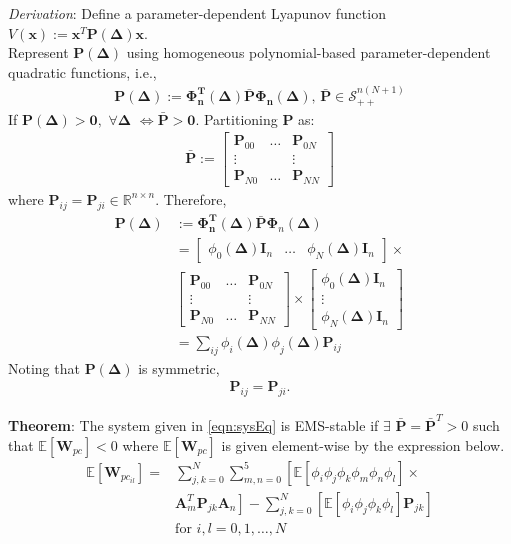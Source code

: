 \documentclass[letterpaper, 10 pt, conference]{ieeeconf}  %
\newcommand{\real}{\mathbb{R}}
\newcommand{\vo}[1]{\boldsymbol{#1}}
\newcommand{\Del}{\vo{\Delta}}
\begin{document}
\textit{Derivation}:
Define a parameter-dependent Lyapunov function $V(\vo{x}) := \vo{x}^T \vo{P}(\Del) \vo{x}$.\\
Represent $\vo{P(\Delta)}$ using homogeneous polynomial-based parameter-dependent quadratic functions, i.e.,
\begin{align}
	\vo{P(\Delta)} := {\vo{\Phi_n^T (\Delta)}} \bar{\vo{P}} \vo{\Phi_n (\Delta)}, \, \bar{\vo{P}} \in \mathcal{S}_{++}^{n(N+1)}
\end{align}
If $\vo{P}(\Del) > \vo{0},$ $\forall\Del $ $\iff \bar{\vo{P}} > \vo{0}$. Partitioning $\vo{P}$ as:
\begin{align*}
  \bar{\vo{P}} := \begin{bmatrix}
    \vo{P}_{00} & \hdots  & \vo{P}_{0N} \\
    \vdots & {} & \vdots \\
    \vo{P}_{N0} & \hdots  & \vo{P}_{NN}
\end{bmatrix}
\end{align*}
where $\vo{P}_{ij} = \vo{P}_{ji} \in \real^{n \times n}$. Therefore,
\begin{align}
  \vo{P(\Delta)} &:= {\vo{\Phi_n^T (\Delta)}} \bar{\vo{P}} \vo{\Phi}_n (\Del) \nonumber \\
  &= \begin{bmatrix}
    \phi_0(\Del)\vo{I}_n & \hdots & \phi_N  (\Del)  \vo{I}_n
\end{bmatrix} \times \nonumber \\
& \begin{bmatrix}
  \vo{P}_{00} & \hdots  & \vo{P}_{0N} \\
  \vdots & {} & \vdots \\
  \vo{P}_{N0} & \hdots  & \vo{P}_{NN}
\end{bmatrix} \times \begin{bmatrix}
  \phi_0(\Del)\vo{I}_n \\ \vdots \\ \phi_N  (\Del)  \vo{I}_n
\end{bmatrix} \nonumber \\
&= \sum_{ij} \phi_i (\Del) \phi_j (\Del) \vo{P}_{ij}
\end{align}
Noting that $\vo{P}(\Del)$ is symmetric,
\begin{align*}
  \vo{P}_{ij} = \vo{P}_{ji}.
\end{align*}

\textbf{Theorem}:
The system given in \eqref{eqn:sysEq} is EMS-stable if $\exists$ $\vo{\bar{P}} = \vo{\bar{P}}^T > 0$ such that $\mathbb{E} [\vo{W}_{pc}] < 0$ where $\mathbb{E} [\vo{W}_{pc}]$ is given element-wise by the expression below.
\begin{align}
        \mathbb{E} [\vo{W}_{pc_{il}}] = &\sum_{j,k = 0}^{N} \sum_{m,n = 0}^{5} \left[ \mathbb{E}[\phi_i \phi_j \phi_k \phi_m \phi_n \phi_l] \times \right. \nonumber\\
         & \left. \vo{A}_m^T \vo{P}_{jk} \vo{A}_n \right] %
        - \sum_{j,k = 0}^{N} \left[ \mathbb{E}[\phi_i \phi_j \phi_k \phi_l] \vo{P}_{jk} \right] \nonumber\\
        &\textrm{for } i, l=0,1,\hdots,N
  \label{eqn:stab}
\end{align}
\end{document}
